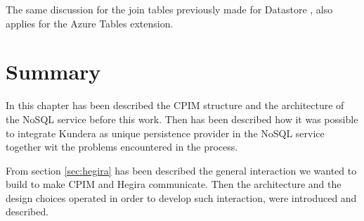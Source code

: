 \noindent The same discussion for the join tables previously made for Datastore , also applies for the Azure Tables extension.

\section{Summary}
In this chapter has been described the CPIM structure and the architecture of the NoSQL service before this work. Then has been described how it was possible to integrate Kundera as unique persistence provider in the NoSQL service together wit the problems encountered in the process.

\noindent From section \ref{sec:hegira} has been described the general interaction we wanted to build to make CPIM and Hegira communicate. Then the architecture and the design choices operated in order to develop such interaction, were introduced and described.

